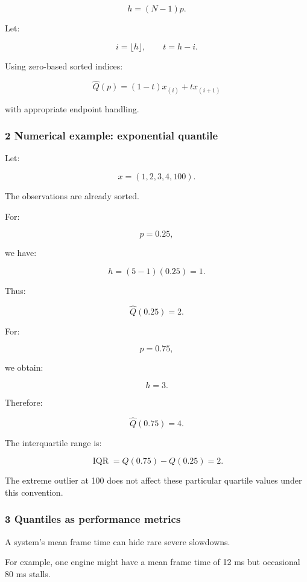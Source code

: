\[
 h=(N-1)p.
\]

Let:

\[
 i=\lfloor h\rfloor, \qquad t=h-i.
\]

Using zero-based sorted indices:

\[
 \boxed{ \hat Q(p)=(1-t)x_{(i)}+t x_{(i+1)} }
\]

with appropriate endpoint handling.

\subsubsection{2 Numerical example: exponential quantile}\label{02-foundations-ii-ch030-numerical-example-exponential-quantile}

\hypertarget{02-foundations-ii-ch030-numerical-example-exponential-quantile}{}

Let:

\[
 x=(1,2,3,4,100).
\]

The observations are already sorted.

For:

\[
 p=0.25,
\]

we have:

\[
 h=(5-1)(0.25)=1.
\]

Thus:

\[
 \hat Q(0.25)=2.
\]

For:

\[
 p=0.75,
\]

we obtain:

\[
 h=3.
\]

Therefore:

\[
 \hat Q(0.75)=4.
\]

The interquartile range is:

\[
 \boxed{ \operatorname{IQR}=Q(0.75)-Q(0.25)=2 }.
\]

The extreme outlier at 100 does not affect these particular quartile values under this convention.

\subsubsection{3 Quantiles as performance metrics}\label{02-foundations-ii-ch030-quantiles-as-performance-metrics}

\hypertarget{02-foundations-ii-ch030-quantiles-as-performance-metrics}{}

A system's mean frame time can hide rare severe slowdowns.

For example, one engine might have a mean frame time of 12 ms but occasional 80 ms stalls.

